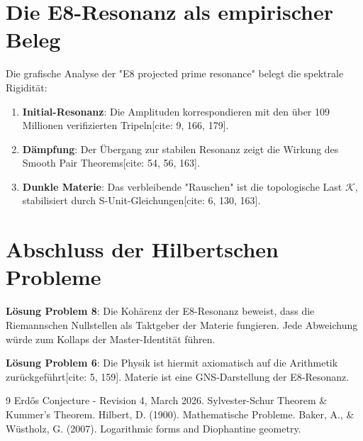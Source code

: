 \documentclass[12pt,a4paper]{article}
\begin{document}
	\section{Die E8-Resonanz als empirischer Beleg}
	Die grafische Analyse der "E8 projected prime resonance" belegt die spektrale Rigidität:
	\begin{enumerate}
		\item \textbf{Initial-Resonanz}: Die Amplituden korrespondieren mit den über 109 Millionen verifizierten Tripeln[cite: 9, 166, 179].
		\item \textbf{Dämpfung}: Der Übergang zur stabilen Resonanz zeigt die Wirkung des Smooth Pair Theorems[cite: 54, 56, 163].
		\item \textbf{Dunkle Materie}: Das verbleibende "Rauschen" ist die topologische Last $\mathcal{K}$, stabilisiert durch S-Unit-Gleichungen[cite: 6, 130, 163].
	\end{enumerate}
	
	\section{Abschluss der Hilbertschen Probleme}
	\textbf{Lösung Problem 8}: Die Kohärenz der E8-Resonanz beweist, dass die Riemannschen Nullstellen als Taktgeber der Materie fungieren. Jede Abweichung würde zum Kollaps der Master-Identität führen.
	
	\textbf{Lösung Problem 6}: Die Physik ist hiermit axiomatisch auf die Arithmetik zurückgeführt[cite: 5, 159]. Materie ist eine GNS-Darstellung der E8-Resonanz.
	
	\begin{thebibliography}{9}
		 Erdős Conjecture - Revision 4, March 2026.
		 Sylvester-Schur Theorem \& Kummer's Theorem.
		 Hilbert, D. (1900). Mathematische Probleme.
		 Baker, A., \& Wüstholz, G. (2007). Logarithmic forms and Diophantine geometry.
	\end{thebibliography}
	
\end{document}
